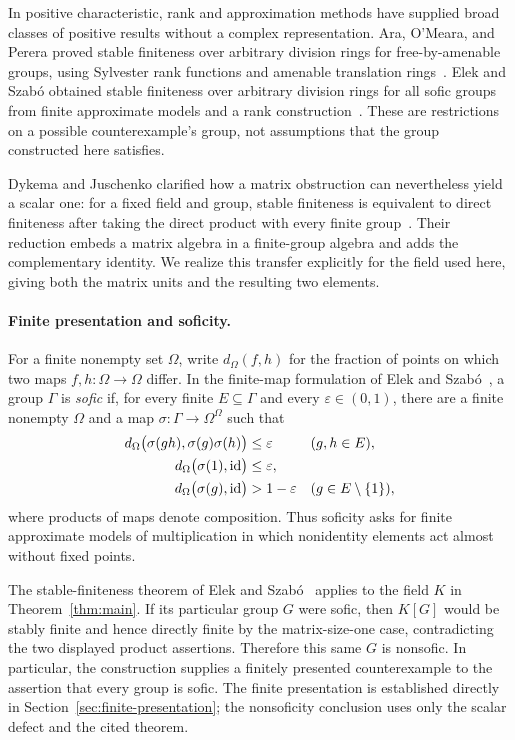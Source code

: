 In positive characteristic, rank and approximation methods have supplied broad classes of positive results without a complex representation. Ara, O'Meara, and Perera proved stable finiteness over arbitrary division rings for free-by-amenable groups, using Sylvester rank functions and amenable translation rings~\cite{AraOMearaPerera2002}. Elek and Szab\'o obtained stable finiteness over arbitrary division rings for all sofic groups from finite approximate models and a rank construction~\cite[Corollary~4.7]{ElekSzabo2004}. These are restrictions on a possible counterexample's group, not assumptions that the group constructed here satisfies.

Dykema and Juschenko clarified how a matrix obstruction can nevertheless yield a scalar one: for a fixed field and group, stable finiteness is equivalent to direct finiteness after taking the direct product with every finite group~\cite[Theorem~2.2]{DykemaJuschenko2015}. Their reduction embeds a matrix algebra in a finite-group algebra and adds the complementary identity. We realize this transfer explicitly for the field used here, giving both the matrix units and the resulting two elements.

\paragraph{Finite presentation and soficity.}
For a finite nonempty set $\Omega$, write $d_\Omega(f,h)$ for the fraction of points on which two maps $f,h:\Omega\to\Omega$ differ. In the finite-map formulation of Elek and Szab\'o~\cite[Definition~4.2]{ElekSzabo2004}, a group $\Gamma$ is \emph{sofic} if, for every finite $E\subseteq\Gamma$ and every $\varepsilon\in(0,1)$, there are a finite nonempty $\Omega$ and a map $\sigma:\Gamma\to\Omega^\Omega$ such that
\[
\begin{aligned}
d_\Omega\bigl(\sigma(gh),\sigma(g)\sigma(h)\bigr)&\le\varepsilon
&& (g,h\in E),\\
d_\Omega\bigl(\sigma(1),\mathrm{id}\bigr)&\le\varepsilon,\\
d_\Omega\bigl(\sigma(g),\mathrm{id}\bigr)&>1-\varepsilon
&& (g\in E\setminus\{1\}),
\end{aligned}
\]
where products of maps denote composition. Thus soficity asks for finite approximate models of multiplication in which nonidentity elements act almost without fixed points.

The stable-finiteness theorem of Elek and Szab\'o~\cite[Corollary~4.7]{ElekSzabo2004} applies to the field $K$ in Theorem~\ref{thm:main}. If its particular group $G$ were sofic, then $K[G]$ would be stably finite and hence directly finite by the matrix-size-one case, contradicting the two displayed product assertions. Therefore this same $G$ is nonsofic. In particular, the construction supplies a finitely presented counterexample to the assertion that every group is sofic. The finite presentation is established directly in Section~\ref{sec:finite-presentation}; the nonsoficity conclusion uses only the scalar defect and the cited theorem.

